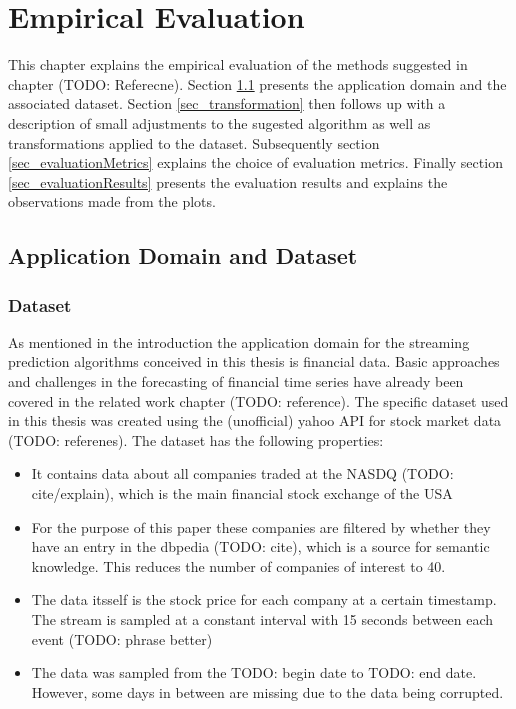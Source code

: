 \chapter{Empirical Evaluation}
\label{chapter_evaluation}

\ifpdf
    \graphicspath{{Chapter5/Figs/Raster/}{Chapter5/Figs/PDF/}{Chapter5/Figs/}}
\else
    \graphicspath{{Chapter5/Figs/Vector/}{Chapter5/Figs/}}
\fi

This chapter explains the empirical evaluation of the methods suggested in chapter (TODO: Referecne). Section \ref{sec_applicationDomain} presents the application domain and the associated dataset. Section \ref{sec_transformation} then follows up with a description of small adjustments to the sugested algorithm as well as transformations applied to the dataset. Subsequently section \ref{sec_evaluationMetrics} explains the choice of evaluation metrics. Finally section \ref{sec_evaluationResults} presents the evaluation results and explains the observations made from the plots.

\section{Application Domain and Dataset}
\label{sec_applicationDomain}

\subsection{Dataset}
As mentioned in the introduction the application domain for the streaming prediction algorithms conceived in this thesis is financial data. Basic approaches and challenges in the forecasting of financial time series have already been covered in the related work chapter (TODO: reference). The specific dataset used in this thesis was created using the (unofficial) yahoo API for stock market data (TODO: referenes). The dataset has the following properties:
\begin{itemize}
	\item It contains data about all companies traded at the NASDQ (TODO: cite/explain), which is the main financial stock exchange of the USA
	\item For the purpose of this paper these companies are filtered by whether they have an entry in the dbpedia (TODO: cite), which is a source for semantic knowledge. This reduces the number of companies of interest to 40.
	\item The data itsself is the stock price for each company at a certain timestamp. The stream is sampled at a constant interval with 15 seconds between each event (TODO: phrase better)
	\item The data was sampled from the TODO: begin date to  TODO: end date. However, some days in between are missing due to the data being corrupted.
\end{itemize}

